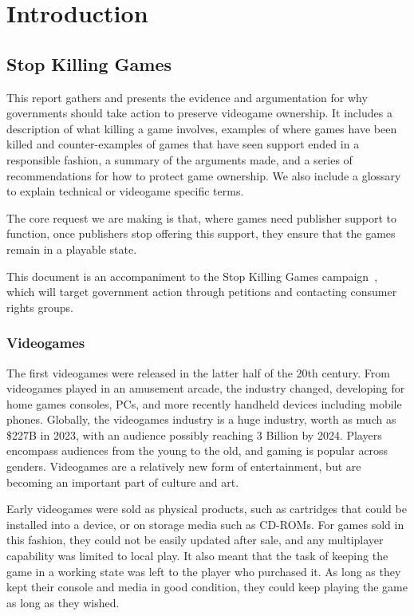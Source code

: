 \chapter{Introduction}

\section{Stop Killing Games}
This report gathers and presents the evidence and argumentation for why governments should take action to preserve \gls{videogame} ownership.
It includes a description of what killing a game involves,
examples of where games have been killed and counter-examples of games that have seen support ended in a responsible fashion,
a summary of the arguments made,
and a series of recommendations for how to protect game ownership.
We also include a glossary to explain technical or videogame specific terms.

The core request we are making is that, where games need publisher support to function,
once publishers stop offering this support,
they ensure that the games remain in a playable state.

This document is an accompaniment to the Stop Killing Games campaign~\cite{stop-killing-games-2024},
which will target government action through petitions and contacting consumer rights groups.

\subsection{Videogames}
The first videogames were released in the latter half of the 20th century.
From videogames played in an amusement arcade, the industry changed, developing for home games consoles, PCs, and more recently handheld devices including mobile phones.
Globally, the videogames industry is a huge industry, worth as much as \$227B in 2023\cite{pwc-games-2023},
with an audience possibly reaching 3 Billion by 2024\cite{stats-gamers-2024}.
Players encompass audiences from the young to the old, and gaming is popular across genders\cite{stereotype-identity-2014}.
Videogames are a relatively new form of entertainment, but are becoming an important part of culture and art.

Early videogames were sold as physical products, such as cartridges that could be installed into a device, or on storage media such as CD-ROMs.
For games sold in this fashion, they could not be easily \gls{update}d after sale, and any multiplayer capability was limited to local play.
It also meant that the task of keeping the game in a working state was left to the player who purchased it.
As long as they kept their console and media in good condition, they could keep playing the game as long as they wished.

